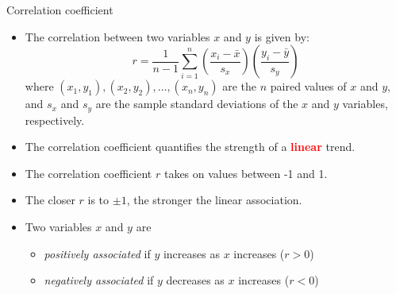 \documentclass[10pt,handout]{beamer}\usepackage[]{graphicx}\usepackage[]{color}
\begin{document}
						
						\begin{frame}{Correlation coefficient}
							\protect\hypertarget{two-numerical-variables}{}
							
								\begin{itemize}
							
							\item The correlation between two variables $x$ and $y$ is given by:
							$$
							r=\frac{1}{n-1} \sum_{i=1}^{n}\left(\frac{x_{i}-\bar{x}}{s_{x}}\right)\left(\frac{y_{i}-\bar{y}}{s_{y}}\right)
							$$
							where $\left(x_{1}, y_{1}\right),\left(x_{2}, y_{2}\right), \ldots,\left(x_{n}, y_{n}\right)$ are the $n$ paired values of $x$ and $y,$ and $s_{x}$ and $s_{y}$ are the sample standard deviations of the $x$ and $y$ variables, respectively.
							
							
							\pause 
							
							\item The correlation coefficient quantifies the strength of a \textbf{\textcolor{red}{linear}} trend.
							
							\pause
							
								\item
							The correlation coefficient \(r\) takes on values between -1 and 1.
							\pause 
							\item
							The closer \(r\) is to \(\pm 1\), the stronger the linear association.
							\pause 
							
\item 	Two variables \(x\) and \(y\) are
							
							\begin{itemize}
								\item
								\emph{positively associated} if \(y\) increases as \(x\) increases ($r>0$)
								\item
								\emph{negatively associated} if \(y\) decreases as \(x\) increases ($r<0$)
							\end{itemize}
						
													\end{itemize}
							
							
						\end{frame}
						
\end{document}
